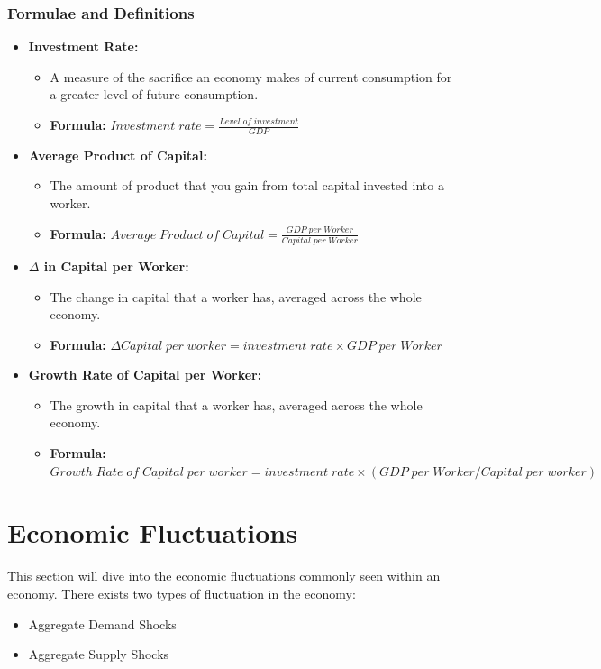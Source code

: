 \documentclass[12pt, letterpaper]{article}
\begin{document}
\subsubsection{Formulae and Definitions}
\begin{itemize}
	\item \textbf{Investment Rate:}
		\begin{itemize}
			\item A measure of the sacrifice an economy makes of current consumption for a greater level of future consumption.
			\item \textbf{Formula:} $Investment\;rate = \frac{Level\;of\;investment}{GDP}$
		\end{itemize}
	\item \textbf{Average Product of Capital:}
		\begin{itemize}
			\item The amount of product that you gain from total capital invested into a worker.
			\item \textbf{Formula:} $Average\;Product\;of\;Capital = \frac{GDP\;per\;Worker}{Capital\;per\;Worker}$
		\end{itemize}
	\item \textbf{$\Delta$ in Capital per Worker:}
		\begin{itemize}
			\item The change in capital that a worker has, averaged across the whole economy.
			\item \textbf{Formula:} $\Delta Capital\;per\;worker = investment\; rate \times GDP\;per\;Worker$
		\end{itemize}
	\item \textbf{Growth Rate of Capital per Worker:}
		\begin{itemize}
			\item The growth in capital that a worker has, averaged across the whole economy.
			\item \textbf{Formula:} $Growth\;Rate\;of\; Capital\;per\;worker = investment\; rate \times (GDP\;per\;Worker / Capital\;per\;worker)$
		\end{itemize}
		
\end{itemize}

\newpage
\section{Economic Fluctuations}
This section will dive into the economic fluctuations commonly seen within an economy. There exists two types of fluctuation in the economy:
\begin{itemize}
	\item Aggregate Demand Shocks
	\item Aggregate Supply Shocks
\end{itemize}
\end{document}
